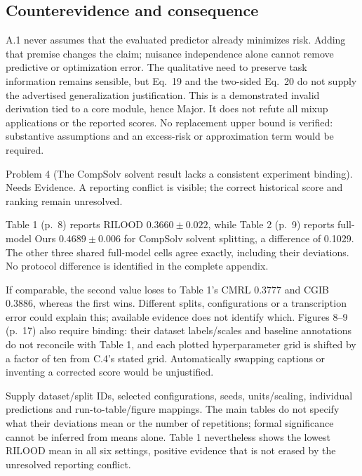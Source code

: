 \documentclass[10pt]{article}
\begin{document}
\subsection*{Counterevidence and consequence}
A.1 never assumes that the evaluated predictor already minimizes risk. Adding that premise changes the claim; nuisance independence alone cannot remove predictive or optimization error. The qualitative need to preserve task information remains sensible, but Eq. 19 and the two-sided Eq. 20 do not supply the advertised generalization justification. This is a demonstrated invalid derivation tied to a core module, hence Major. It does not refute all mixup applications or the reported scores. No replacement upper bound is verified: substantive assumptions and an excess-risk or approximation term would be required.\par
Problem 4 (The CompSolv solvent result lacks a consistent experiment binding).  Needs Evidence. A reporting conflict is visible; the correct historical score and ranking remain unresolved.\par
Table 1 (p. 8) reports RILOOD \(0.3660\pm0.022\), while Table 2 (p. 9) reports full-model Ours \(0.4689\pm0.006\) for CompSolv solvent splitting, a difference of 0.1029. The other three shared full-model cells agree exactly, including their deviations. No protocol difference is identified in the complete appendix.\par
If comparable, the second value loses to Table 1’s CMRL 0.3777 and CGIB 0.3886, whereas the first wins. Different splits, configurations or a transcription error could explain this; available evidence does not identify which. Figures 8–9 (p. 17) also require binding: their dataset labels/scales and baseline annotations do not reconcile with Table 1, and each plotted hyperparameter grid is shifted by a factor of ten from C.4’s stated grid. Automatically swapping captions or inventing a corrected score would be unjustified.\par
Supply dataset/split IDs, selected configurations, seeds, units/scaling, individual predictions and run-to-table/figure mappings. The main tables do not specify what their deviations mean or the number of repetitions; formal significance cannot be inferred from means alone. Table 1 nevertheless shows the lowest RILOOD mean in all six settings, positive evidence that is not erased by the unresolved reporting conflict.\par
\end{document}
